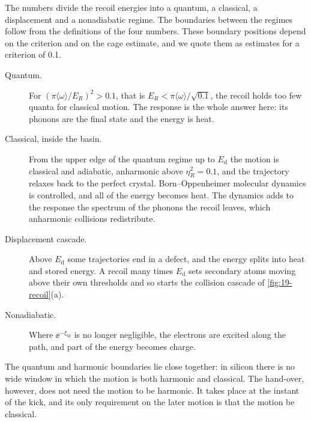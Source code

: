 The numbers divide the recoil energies into a quantum, a classical, a displacement and a nonadiabatic regime. The boundaries between the regimes follow from the definitions of the four numbers. These boundary positions depend on the criterion and on the cage estimate, and we quote them as estimates for a criterion of 0.1.
\begin{description}
\item[Quantum.] For $(\pi\langle\omega\rangle/E_R)^2 > 0.1$, that is $E_R < \pi\langle\omega\rangle/\sqrt{0.1}$, the recoil holds too few quanta for classical motion. The response is the whole answer here: its phonons are the final state and the energy is heat.
\item[Classical, inside the basin.] From the upper edge of the quantum regime up to $E_{\mathrm{d}}$ the motion is classical and adiabatic, anharmonic above $\eta_R^2 = 0.1$, and the trajectory relaxes back to the perfect crystal. Born--Oppenheimer molecular dynamics is controlled, and all of the energy becomes heat. The dynamics adds to the response the spectrum of the phonons the recoil leaves, which anharmonic collisions redistribute.
\item[Displacement cascade.] Above $E_{\mathrm{d}}$ some trajectories end in a defect, and the energy splits into heat and stored energy. A recoil many times $E_{\mathrm{d}}$ sets secondary atoms moving above their own thresholds and so starts the collision cascade of \cref{fig:19-recoil}(a).
\item[Nonadiabatic.] Where $\ee^{-\xi_{\mathrm{M}}}$ is no longer negligible, the electrons are excited along the path, and part of the energy becomes charge.
\end{description}
The quantum and harmonic boundaries lie close together: in silicon there is no wide window in which the motion is both harmonic and classical. The hand-over, however, does not need the motion to be harmonic. It takes place at the instant of the kick, and its only requirement on the later motion is that the motion be classical.

